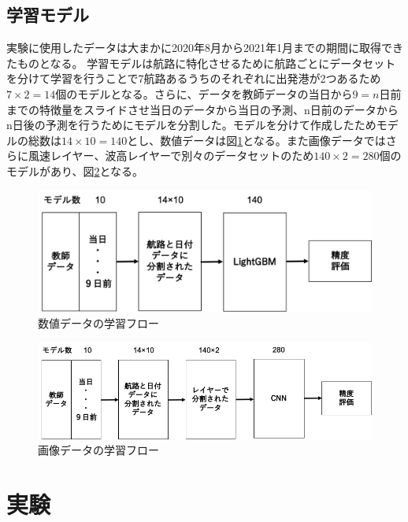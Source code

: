 \documentclass[twocolumn,twoside,9.5pt]{jsarticle}
\begin{document}
\subsection{学習モデル}
実験に使用したデータは大まかに2020年8月から2021年1月までの期間に取得できたものとなる。
学習モデルは航路に特化させるために航路ごとにデータセットを分けて学習を行うことで7航路あるうちのそれぞれに出発港が2つあるため$7\times2=14$個のモデルとなる。さらに、データを教師データの当日から$9=n$日前までの特徴量をスライドさせ当日のデータから当日の予測、n日前のデータからn日後の予測を行うためにモデルを分割した。モデルを分けて作成したためモデルの総数は$14\times10=140$とし、数値データは図\ref{value_flow}となる。また画像データではさらに風速レイヤー、波高レイヤーで別々のデータセットのため$140\times2=280$個のモデルがあり、図\ref{img_flow}となる。

\begin{figure}[H]
 \centering
 \includegraphics[keepaspectratio, scale=0.3]{pic/value_flow.png}
 \caption{数値データの学習フロー}
 \label{value_flow}
\end{figure}

\begin{figure}[H]
 \centering
 \includegraphics[keepaspectratio, scale=0.3]{pic/img_flow.png}
 \caption{画像データの学習フロー}
 \label{img_flow}
\end{figure}

\section{実験}
\end{document}
